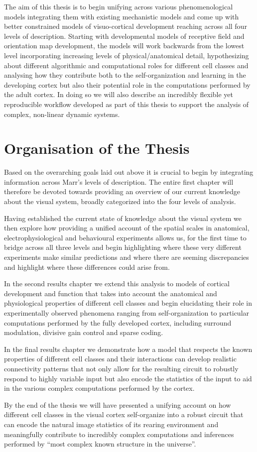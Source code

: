 The aim of this thesis is to begin unifying across various
phenomenological models integrating them with existing mechanistic
models and come up with better constrained models of visuo-cortical
development reaching across all four levels of description. Starting
with developmental models of receptive field and orientation map
development, the models will work backwards from the lowest level
incorporating increasing levels of physical/anatomical detail,
hypothesizing about different algorithmic and computational roles for
different cell classes and analysing how they contribute both to the
self-organization and learning in the developing cortex but also their
potential role in the computations performed by the adult cortex. In
doing so we will also describe an incredibly flexible yet reproducible
workflow developed as part of this thesis to support the analysis of
complex, non-linear dynamic systems.

\section{Organisation of the Thesis}

Based on the overarching goals laid out above it is crucial to begin
by integrating information across Marr's levels of description. The
entire first chapter will therefore be devoted towards providing an
overview of our current knowledge about the visual system, broadly
categorized into the four levels of analysis.

Having established the current state of knowledge about the visual
system we then explore how providing a unified account of the spatial
scales in anatomical, electrophysiological and behavioural experiments
allows us, for the first time to bridge across all three levels and
begin highlighting where these very different experiments make similar
predictions and where there are seeming discrepancies and highlight
where these differences could arise from.

In the second results chapter we extend this analysis to models of
cortical development and function that takes into account the
anatomical and physiological properties of different cell classes and
begin elucidating their role in experimentally observed phenomena
ranging from self-organization to particular computations performed by
the fully developed cortex, including surround modulation, divisive
gain control and sparse coding.

In the final results chapter we demonstrate how a model that respects
the known properties of different cell classes and their interactions
can develop realistic connectivity patterns that not only allow for
the resulting circuit to robustly respond to highly variable input but
also encode the statistics of the input to aid in the various complex
computations performed by the cortex.

By the end of the thesis we will have presented a unifying account on
how different cell classes in the visual cortex self-organize into a
robust circuit that can encode the natural image statistics of its
rearing environment and meaningfully contribute to incredibly complex
computations and inferences performed by ``most complex known
structure in the universe''.

